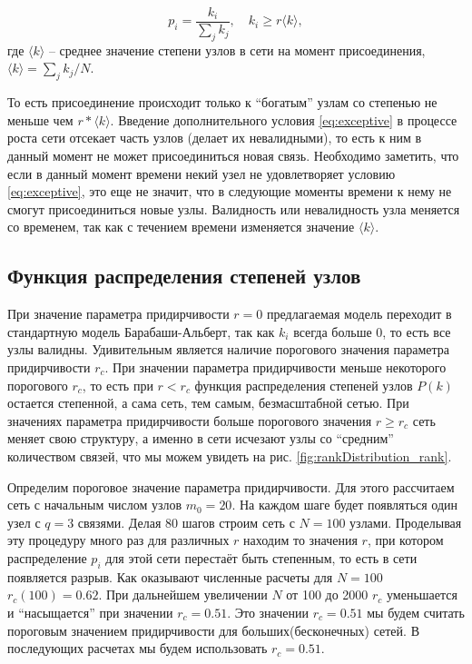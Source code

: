 \documentclass[10pt,aps,pra]{revtex4-1}
\begin{document}
            \begin{equation}\label{eq:exceptive}
                p_i = \frac{k_i}{\sum\limits_{j} k_j},\quad k_i \geq r \langle k \rangle,
            \end{equation}
                где $\langle k \rangle$ – среднее значение степени узлов в сети на момент присоединения, $\langle k \rangle = \sum\limits_{j}{k_j}/{N}$.

        То есть присоединение происходит только к ``богатым'' узлам со степенью не меньше чем $r*\langle k \rangle$. Введение дополнительного условия \eqref{eq:exceptive} в процессе роста сети отсекает часть узлов (делает их невалидными), то есть к ним в данный момент не может присоединиться новая связь. Необходимо заметить, что если в данный момент времени некий узел не удовлетворяет условию \eqref{eq:exceptive}, это еще не значит, что в следующие моменты времени к нему не смогут присоединиться новые узлы. Валидность или невалидность узла меняется со временем, так как с течением времени изменяется значение $\langle k \rangle$.

    \subsection{Функция распределения степеней узлов}

        При значение параметра придирчивости $r=0$ предлагаемая модель переходит в стандартную модель Барабаши-Альберт, так как $k_i$ всегда больше 0, то есть все узлы валидны. Удивительным является наличие порогового значения параметра придирчивости $r_c$. При значении параметра придирчивости меньше некоторого порогового $r_c$, то есть при $r<r_c$ функция распределения степеней узлов $P(k)$ остается степенной, а сама сеть, тем самым, безмасштабной сетью. При значениях параметра придирчивости больше порогового значения $r \geq r_c$ сеть меняет свою структуру, а именно в сети исчезают узлы со ``средним'' количеством связей, что мы можем увидеть на рис. \ref{fig:rankDistribution_rank}. 

        Определим пороговое значение параметра придирчивости. Для этого рассчитаем сеть с начальным числом узлов $m_0 = 20$. На каждом шаге будет появляться один узел с $q=3$ связями. Делая 80 шагов строим сеть с $N=100$ узлами. Проделывая эту процедуру много раз для различных $r$ находим то значения $r$, при котором распределение $p_i$ для этой сети перестаёт быть степенным, то есть в сети появляется разрыв. Как оказывают численные расчеты для $N=100$ $r_c(100) = 0.62$. При дальнейшем увеличении $N$ от 100 до 2000 $r_c$ уменьшается и ``насыщается'' при значении $r_c=0.51$. Это значении $r_c=0.51$ мы будем считать пороговым значением придирчивости для больших(бесконечных) сетей. В последующих расчетах мы будем использовать $r_c=0.51$.
\end{document}
